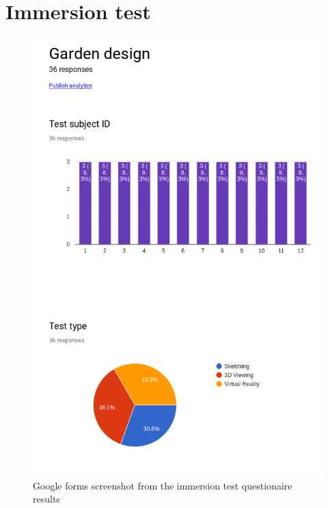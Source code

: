 \section{Immersion test}\label{sec:appendixImmersionTest}
\begin{multicols}{2}
	\begin{figure}[H]
		\includegraphics[width=1.0\linewidth]{include/Appendices/immersionQuestionnaire/1.png}
		\caption{Google forms screenshot from the immersion test questionaire results}
	\end{figure}
	\begin{figure}[H]

\end{figure}
\end{multicols}
